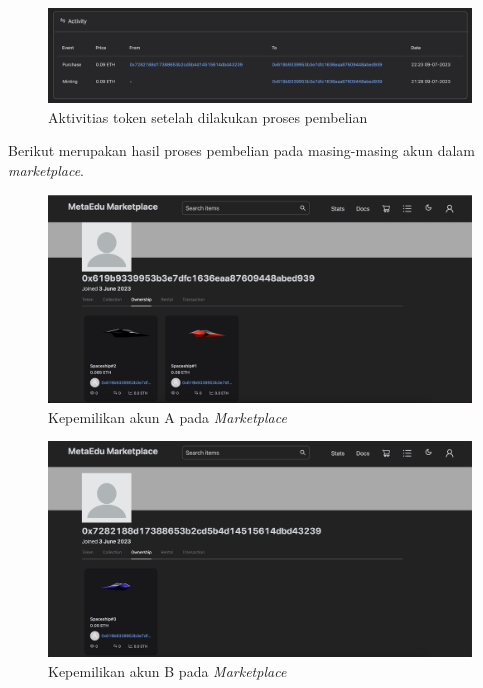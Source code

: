         
  \begin{figure} [H] \centering
            \includegraphics[scale=0.2]{gambar/img-test-integration-purchase-history-1.png}
            \caption{Aktivitias token setelah dilakukan proses pembelian}
            \label{fig:TestIntegrationPurchaseHistory1}
        \end{figure}


Berikut merupakan hasil proses pembelian pada masing-masing akun dalam \emph{marketplace}.

  \begin{figure} [H] \centering
            \includegraphics[scale=0.2]{gambar/img-test-integration-purchase-profile-1.png}
            \caption{Kepemilikan akun A pada \emph{Marketplace}}
            \label{fig:TestIntegrationPurchaseProfile1}
        \end{figure}

  \begin{figure} [H] \centering
            \includegraphics[scale=0.2]{gambar/img-test-integration-purchase-profile-2.png}
            \caption{Kepemilikan akun B pada \emph{Marketplace}}
            \label{fig:TestIntegrationPurchaseProfile2}
        \end{figure}
        

